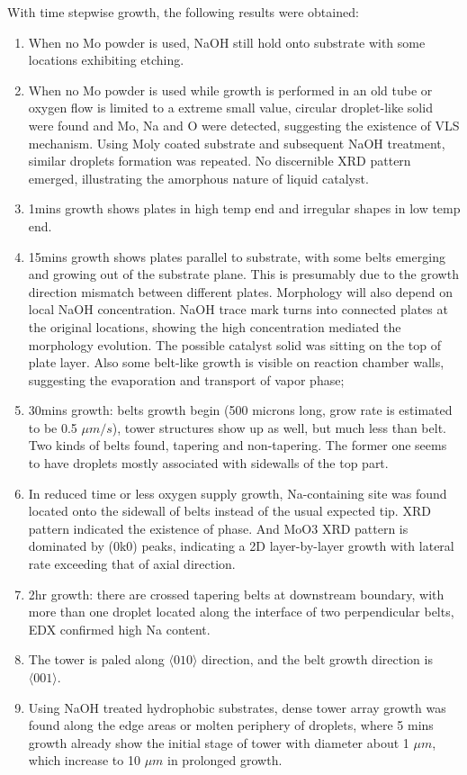 With time stepwise growth, the following results were obtained:

\begin{enumerate}
\item When no Mo powder is used, NaOH still hold onto substrate with some locations exhibiting etching.
\item When no Mo powder is used while growth is performed in an old tube or oxygen flow is limited to a extreme small value, circular droplet-like solid were found and Mo, Na and O were detected, suggesting the existence of VLS mechanism. Using Moly coated substrate and subsequent NaOH treatment, similar droplets formation was repeated. No discernible XRD pattern emerged, illustrating the amorphous nature of liquid catalyst.
\item 1mins growth shows plates in high temp end and irregular shapes in low temp end.
\item 15mins growth shows  plates parallel to substrate, with some belts emerging and growing out of the substrate plane. This is presumably due to the growth direction mismatch between different plates. Morphology will also depend on local NaOH concentration. NaOH trace mark turns into connected plates at the original locations, showing the high concentration mediated the morphology evolution. The possible catalyst solid was sitting on the top of plate layer. Also some belt-like growth is visible on reaction chamber walls, suggesting the evaporation and transport of  vapor phase;
\item 30mins growth:  belts growth begin (500 microns long, grow rate is estimated to be 0.5 $\mu m/s$), tower structures show up as well, but much less than belt. Two kinds of belts found, tapering and non-tapering. The former one seems to have droplets mostly associated with sidewalls of the top part.
\item In reduced time or less oxygen supply growth, Na-containing site was found located onto the sidewall of belts instead of the usual expected tip. XRD pattern indicated the existence of  phase. And MoO3 XRD pattern is dominated by (0k0) peaks, indicating a 2D layer-by-layer growth with lateral rate exceeding that of axial direction.
\item 2hr growth: there are crossed tapering belts at downstream boundary, with more than one droplet located along the interface of two perpendicular belts, EDX confirmed high Na content.
\item The tower is paled along $\langle010\rangle$ direction, and the belt growth direction is $\langle001\rangle$.
\item Using NaOH treated hydrophobic substrates, dense tower array growth was found along the edge areas or molten periphery of droplets, where 5 mins growth already show the initial stage of tower with diameter about 1 $\mu m$, which increase to 10 $\mu m$ in prolonged growth.
\end{enumerate}

